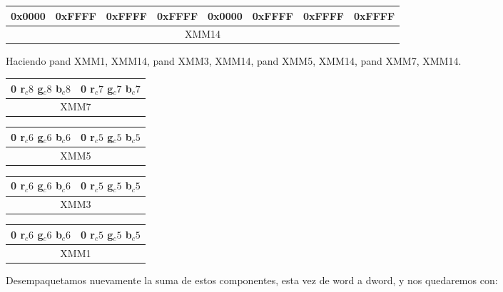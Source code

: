 \begin{table}[!h]
	\centering
	\begin{tabular}{| c | c | c | c | c | c | c | c |}
		\hline
		0x0000 & 0xFFFF & 0xFFFF & 0xFFFF & 0x0000 & 0xFFFF & 0xFFFF & 0xFFFF 
		\\ \hline
		\multicolumn{8}{c}{XMM14} \\
	\end{tabular}
\end{table}

\newpage

Haciendo pand XMM1, XMM14, pand XMM3, XMM14, pand XMM5, XMM14, pand XMM7, XMM14.

\begin{table}[!h]
	\centering
	\begin{tabular}{| c | c |}
		\hline
		0 r$_c8$ g$_c8$ b$_c8$ & 0 r$_c7$ g$_c7$ b$_c7$
		\\ \hline
		\multicolumn{2}{c}{XMM7} \\
	\end{tabular}
	\begin{tabular}{| c | c |}
		\hline
		0 r$_c6$ g$_c6$ b$_c6$ & 0 r$_c5$ g$_c5$ b$_c5$
		\\ \hline
		\multicolumn{2}{c}{XMM5} \\
	\end{tabular}
	\begin{tabular}{| c | c |}
		\hline
		0 r$_c6$ g$_c6$ b$_c6$ & 0 r$_c5$ g$_c5$ b$_c5$
		\\ \hline
		\multicolumn{2}{c}{XMM3} \\
	\end{tabular}
	\begin{tabular}{| c | c |}
		\hline
		0 r$_c6$ g$_c6$ b$_c6$ & 0 r$_c5$ g$_c5$ b$_c5$
		\\ \hline
		\multicolumn{2}{c}{XMM1} \\
	\end{tabular}
\end{table}

Desempaquetamos nuevamente la suma de estos componentes, esta vez de word a dword, y nos quedaremos con:

